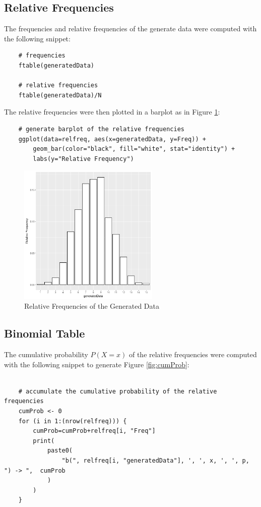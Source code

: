 \documentclass{article}
\begin{document}
        \subsection{Relative Frequencies}
            The frequencies and relative frequencies of the generate data were computed with the following snippet:
\begin{lstlisting}
    # frequencies
    ftable(generatedData)

    # relative frequencies
    ftable(generatedData)/N
\end{lstlisting}

            The relative frequencies were then plotted in a barplot as in Figure \ref{fig:relfreq}:
\begin{lstlisting}
    # generate barplot of the relative frequencies
    ggplot(data=relfreq, aes(x=generatedData, y=Freq)) + 
        geom_bar(color="black", fill="white", stat="identity") +
        labs(y="Relative Frequency")
\end{lstlisting}

            \begin{figure}[h]
                \begin{center}
                    \includegraphics[width=0.6\textwidth]{figures/relfreq.png}
                    \caption{Relative Frequencies of the Generated Data} \label{fig:relfreq}
                \end{center}
            \end{figure}

        \subsection{Binomial Table}
            The cumulative probability $P(X=x)$ of the relative frequencies were computed with the following snippet to generate Figure \ref{fig:cumProb}:
\begin{lstlisting}
    
    # accumulate the cumulative probability of the relative frequencies
    cumProb <- 0
    for (i in 1:(nrow(relfreq))) {
        cumProb=cumProb+relfreq[i, "Freq"]
        print(
            paste0(
                "b(", relfreq[i, "generatedData"], ', ', x, ', ', p, ") -> ",  cumProb
            )
        )
    }
\end{lstlisting}
\end{document}
